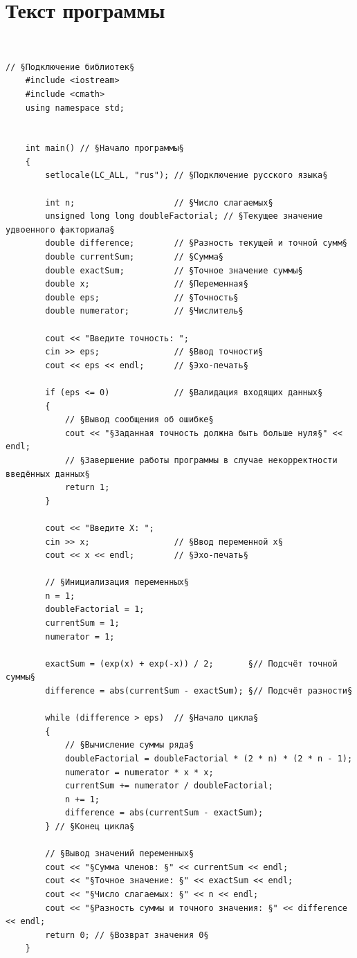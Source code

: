 \documentclass[a4paper]{article}
\begin{document}
	\newpage
	
	\section{Текст программы}
	
	\
	\begin{lstlisting}[style={CppCodeStyle}]
	// §Подключение библиотек§
	#include <iostream>
	#include <cmath>
	using namespace std;
	
	
	int main() // §Начало программы§
	{
		setlocale(LC_ALL, "rus"); // §Подключение русского языка§
		
		int n;                    // §Число слагаемых§
		unsigned long long doubleFactorial; // §Текущее значение удвоенного факториала§
		double difference;        // §Разность текущей и точной сумм§
		double currentSum;        // §Сумма§
		double exactSum;          // §Точное значение суммы§
		double x;                 // §Переменная§
		double eps;               // §Точность§
		double numerator;         // §Числитель§
		
		cout << "Введите точность: ";
		cin >> eps;               // §Ввод точности§
		cout << eps << endl;      // §Эхо-печать§
		
		if (eps <= 0)             // §Валидация входящих данных§
		{
			// §Вывод сообщения об ошибке§
			cout << "§Заданная точность должна быть больше нуля§" << endl; 
			// §Завершение работы программы в случае некорректности введённых данных§
			return 1;
		}
		
		cout << "Введите X: ";
		cin >> x;                 // §Ввод переменной x§
		cout << x << endl;        // §Эхо-печать§
		
		// §Инициализация переменных§
		n = 1;
		doubleFactorial = 1;
		currentSum = 1;
		numerator = 1;
		
		exactSum = (exp(x) + exp(-x)) / 2;       §// Подсчёт точной суммы§
		difference = abs(currentSum - exactSum); §// Подсчёт разности§
		
		while (difference > eps)  // §Начало цикла§
		{
			// §Вычисление суммы ряда§
			doubleFactorial = doubleFactorial * (2 * n) * (2 * n - 1);
			numerator = numerator * x * x;
			currentSum += numerator / doubleFactorial;
			n += 1;
			difference = abs(currentSum - exactSum);
		} // §Конец цикла§
		
		// §Вывод значений переменных§
		cout << "§Сумма членов: §" << currentSum << endl;
		cout << "§Точное значение: §" << exactSum << endl;
		cout << "§Число слагаемых: §" << n << endl;
		cout << "§Разность суммы и точного значения: §" << difference << endl;
		return 0; // §Возврат значения 0§
	}
	
	\end{lstlisting}
	\newpage
	
\end{document}
